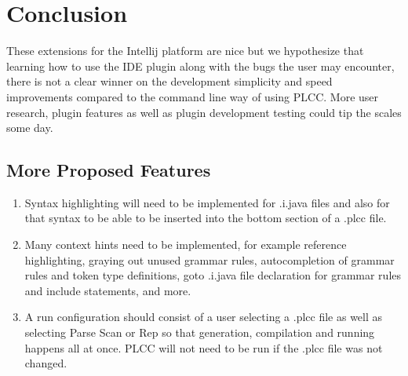 \documentclass[conference, letterpaper]{IEEEtran}
\begin{document}
\section{Conclusion}\label{sec:conclusion}
These extensions for the Intellij platform are nice but we hypothesize that learning how to use the IDE plugin along with the bugs the user may encounter, there is not a clear winner on the development simplicity and speed improvements compared to the command line way of using PLCC\@.
More user research, plugin features as well as plugin development testing could tip the scales some day.

\subsection{More Proposed Features}\label{subsec:more-proposed-features}
\begin{enumerate}
    \item Syntax highlighting will need to be implemented for .i.java files and also for that syntax to be able to be inserted into the bottom section of a .plcc file.
    \item Many context hints need to be implemented, for example reference highlighting, graying out unused grammar rules, autocompletion of grammar rules and token type definitions, goto .i.java file declaration for grammar rules and include statements, and more.
    \item A run configuration should consist of a user selecting a .plcc file as well as selecting Parse Scan or Rep so that generation, compilation and running happens all at once.
    PLCC will not need to be run if the .plcc file was not changed.
\end{enumerate}

%
%
\end{document}
